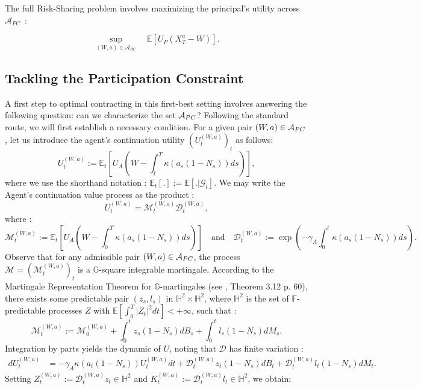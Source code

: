 \documentclass[numbook, envcountsect, envcountsame, envcountreset, runningheads, smallextended]{article}
\def \E{\mathbb{E}}
\def\Ac{{\cal A}}
\begin{document}
The full Risk-Sharing problem involves maximizing the principal's utility across $\mathcal{A}_{PC}$~:

\begin{equation}
\label{eq:prob}
\sup_{(W,a) \in \mathcal{A}_{PC}} \quad \E\left[U_P\left(X^{a}_T-W\right)\right].
\end{equation}


\subsection{Tackling the Participation Constraint}

A first step to optimal contracting in this first-best setting involves answering the following question:  can we characterize the set $\Ac_{PC}$? 
Following the standard route, we will first establish a necessary condition. For a given pair $(W,a) \in \Ac_{PC}$, let us introduce the agent’s continuation utility $(U^{(W,a)}_t)_t$ as follows:
$$ U^{(W,a)}_t := \E_t\left[ U_A\left( W - \int_t^T \kappa(a_s(1-N_s)) ds\right) \right], $$
where we use the shorthand notation : $\E_t[.] := \E[. | \mathcal{G}_t].$ 
We may write the Agent's continuation value process as the product  : 
 $$  U^{(W,a)}_t = \mathcal{M}_t^{(W,a)} \mathcal{D}_t^{(W,a)},$$
 where :
 $$  \mathcal{M}_t^{(W,a)} :=  \E_t\left[ U_A\left( W - \int_0^T \kappa(a_s(1-N_s)) ds\right) \right] \quad \text{and} \quad \mathcal{D}_t^{(W,a)} := \exp\left( -\gamma_A \int_0^t \kappa(a_s(1-N_s)) ds\right).$$
 Observe that for any admissible pair $(W,a)  \in \Ac_{PC}$, the process $\mathcal{M}=(\mathcal{M}_t^{(W,a)})_t$ is a $\mathbb{G}$-square integrable martingale.
 According to the Martingale Representation Theorem for $\mathbb{G}$-martingales (see \cite{AksamitJeanblanc}, Theorem 3.12 p. 60), there exists some predictable pair $(z_s, l_s)$ in $ \mathbb{H}^2 \times \mathbb{H}^2$,
 where $\mathbb{H}^2$ is the set of $\mathbb{F}$-predictable processes $Z$ with $\E\left[\int_0^T |Z_t|^2 dt\right] < + \infty$, such that : 
 $$  \mathcal{M}_t^{(W,a)}  :=   \mathcal{M}_0^{(W,a)} + \int_0^t z_s(1-N_s) dB_s + \int_0^t l_s(1-N_s) dM_s. $$
 Integration by parts yields the dynamic of $U$, noting that $\mathcal{D}$ has finite variation : 
 \begin{align*}
 d U_t^{(W,a)}  
 &= -\gamma_A \kappa(a_t(1-N_s) )  U_t^{(W,a)} dt + \mathcal{D}_t^{(W,a)} z_t(1-N_s)  dB_t +  \mathcal{D}_t^{(W,a)} l_t(1-N_s)  dM_t.
 \end{align*}
Setting $ Z_t^{(W,a)}  := \mathcal{D}_t^{(W,a)} z_t \in \mathbb{H}^2$ and $ K_t^{(W,a)} := \mathcal{D}_t^{(W,a)} l_t  \in \mathbb{H}^2$, we obtain: 
\end{document}
